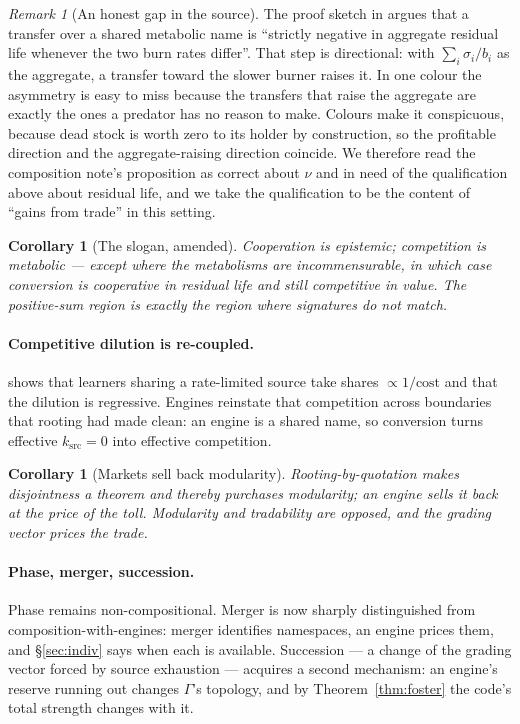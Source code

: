 \documentclass[11pt]{article}
\theoremstyle{plain}
\newtheorem{corollary}[theorem]{Corollary}
\theoremstyle{definition}
\theoremstyle{remark}
\newtheorem{remark}[theorem]{Remark}
\begin{document}
\begin{remark}[An honest gap in the source]
The proof sketch in \cite[\S6.1]{compose} argues that a transfer over a
shared metabolic name is ``strictly negative in aggregate residual life
whenever the two burn rates differ''. That step is directional: with
$\sum_i \sigma_i/b_i$ as the aggregate, a transfer toward the slower burner
raises it. In one colour the asymmetry is easy to miss because the
transfers that raise the aggregate are exactly the ones a predator has no
reason to make. Colours make it conspicuous, because dead stock is worth
zero to its holder by construction, so the profitable direction and the
aggregate-raising direction coincide. We therefore read the composition
note's proposition as correct about $\nu$ and in need of the qualification
above about residual life, and we take the qualification to be the content
of ``gains from trade'' in this setting.
\end{remark}

\begin{corollary}[The slogan, amended]
\emph{Cooperation is epistemic; competition is metabolic} --- except where
the metabolisms are incommensurable, in which case conversion is
cooperative in residual life and still competitive in value. The
positive-sum region is exactly the region where signatures do not match.
\end{corollary}

\paragraph{Competitive dilution is re-coupled.} \cite[\S9]{compose} shows
that learners sharing a rate-limited source take shares $\propto 1/\text{cost}$
and that the dilution is regressive. Engines reinstate that competition
across boundaries that rooting had made clean: an engine is a shared name,
so conversion turns effective $k_{\mathrm{src}} = 0$ into effective
competition.

\begin{corollary}[Markets sell back modularity]
Rooting-by-quotation makes disjointness a theorem and thereby purchases
modularity; an engine sells it back at the price of the toll. Modularity
and tradability are opposed, and the grading vector prices the trade.
\end{corollary}

\paragraph{Phase, merger, succession.} Phase remains non-compositional.
Merger is now sharply distinguished from composition-with-engines: merger
identifies namespaces, an engine prices them, and \S\ref{sec:indiv} says
when each is available. Succession --- a change of the grading vector
forced by source exhaustion --- acquires a second mechanism: an engine's
reserve running out changes $\Gamma$'s topology, and by
Theorem~\ref{thm:foster} the code's total strength changes with it.
\end{document}
